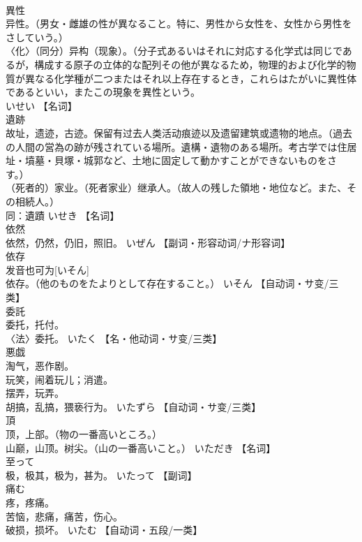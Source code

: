 \documentclass[8pt]{extreport}
\begin{document}
\begin{CJK}{UTF8}{min}
\\	異性	
\\	异性。（男女・雌雄の性が異なること。特に、男性から女性を、女性から男性をさしていう。） 
\\	〈化〉（同分）异构（现象）。（分子式あるいはそれに対応する化学式は同じであるが，構成する原子の立体的な配列その他が異なるため，物理的および化学的物質が異なる化学種が二つまたはそれ以上存在するとき，これらはたがいに異性体
\\	であるといい，またこの現象を異性という。　
\\	いせい		【名词】
\\	遺跡	
\\	故址，遗迹，古迹。保留有过去人类活动痕迹以及遗留建筑或遗物的地点。（過去の人間の営為の跡が残されている場所。遺構・遺物のある場所。考古学では住居址・墳墓・貝塚・城郭など、土地に固定して動かすことができないものをさす。） 
\\	（死者的）家业。（死者家业）继承人。（故人の残した領地・地位など。また、その相続人。） 
\\	同：遺蹟	いせき		【名词】
\\	依然	
\\	依然，仍然，仍旧，照旧。	いぜん		【副词・形容动词/ナ形容词】
\\	依存	
\\	发音也可为[いそん] 
\\	依存。（他のものをたよりとして存在すること。）	いそん		【自动词・サ变/三类】
\\	委託	
\\	委托，托付。 
\\	〈法〉委托。	いたく		【名・他动词・サ变/三类】
\\	悪戯	
\\	淘气，恶作剧。 
\\	玩笑，闹着玩儿；消遣。 
\\	摆弄，玩弄。 
\\	胡搞，乱搞，猥亵行为。	いたずら		【自动词・サ变/三类】
\\	頂	
\\	顶，上部。（物の一番高いところ。） 
\\	山巅，山顶。树尖。（山の一番高いこと。）	いただき		【名词】
\\	至って	
\\	极，极其，极为，甚为。	いたって		【副词】
\\	痛む	
\\	疼，疼痛。 
\\	苦恼，悲痛，痛苦，伤心。 
\\	破损，损坏。	いたむ		【自动词・五段/一类】

\end{CJK}
\end{document}
